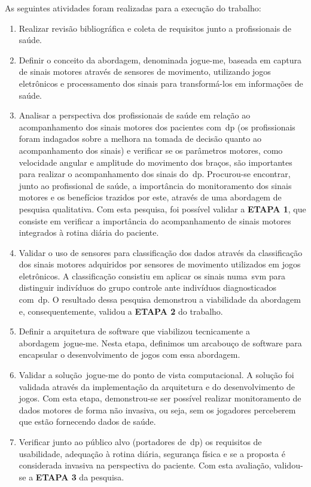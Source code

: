 As seguintes atividades foram realizadas para a execução do trabalho:

\begin{enumerate}

\item{Realizar revisão bibliográfica e coleta de requisitos junto a profissionais de saúde.}

\item{Definir o conceito da abordagem, denominada \ac{jogue-me}, baseada em captura de sinais motores através de sensores de movimento, utilizando jogos eletrônicos e processamento dos sinais para transformá-los em informações de saúde.}


\item{Analisar a perspectiva dos profissionais de saúde em relação ao acompanhamento dos sinais motores dos pacientes com~\ac{dp} (os profissionais foram indagados sobre a melhora na tomada de decisão quanto ao acompanhamento dos sinais) e verificar se os parâmetros motores, como velocidade angular e amplitude do movimento dos braços, são importantes para realizar o acompanhamento dos sinais do~\ac{dp}. Procurou-se encontrar, junto ao profissional de saúde, a importância do monitoramento dos sinais motores e os benefícios trazidos por este, através de uma abordagem de pesquisa qualitativa. Com esta pesquisa, foi possível validar a \textbf{ETAPA 1}, que consiste em verificar a importância do acompanhamento de sinais motores integrados à rotina diária do paciente.}

\item{Validar o uso de sensores para classificação dos dados através da classificação dos sinais motores adquiridos por sensores de movimento utilizados em jogos eletrônicos. A classificação consistiu em aplicar os sinais numa~\ac{svm} para distinguir indivíduos do grupo controle ante indivíduos diagnosticados com~\ac{dp}.
O resultado dessa pesquisa demonstrou a viabilidade da abordagem e, consequentemente, validou a \textbf{ETAPA 2} do trabalho.}

\item{Definir a arquitetura de software que viabilizou tecnicamente a abordagem~\ac{jogue-me}. Nesta etapa, definimos um arcabouço de software para encapsular o desenvolvimento de jogos com essa abordagem.}

\item{Validar a solução~\ac{jogue-me} do ponto de vista computacional. A solução foi validada através da implementação da arquitetura e do desenvolvimento de jogos. Com esta etapa, demonstrou-se ser possível realizar monitoramento de dados motores de forma não invasiva, ou seja, sem os jogadores perceberem que estão fornecendo dados de saúde.}

\item{Verificar junto ao público alvo (portadores de~\ac{dp}) os requisitos de usabilidade, adequação à rotina diária, segurança física e se a proposta é considerada invasiva na perspectiva do paciente. Com esta avaliação, validou-se a \textbf{ETAPA 3} da pesquisa.}

\end{enumerate}

